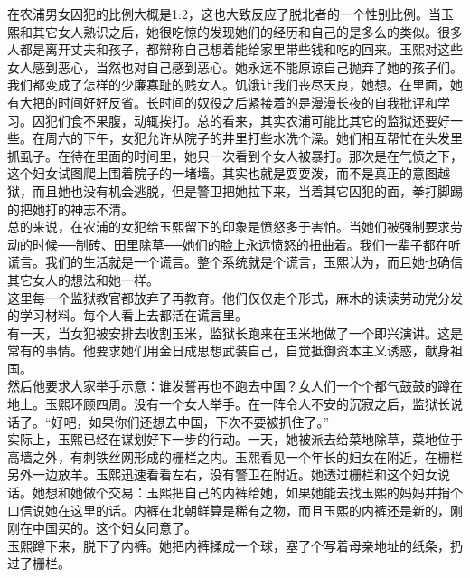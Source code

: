 \begin{multicols}{\theparacolNo}
在农浦男女囚犯的比例大概是1:2，这也大致反应了脱北者的一个性别比例。当玉熙和其它女人熟识之后，她很吃惊的发现她们的经历和自己的是多么的类似。很多人都是离开丈夫和孩子，都辩称自己想着能给家里带些钱和吃的回来。玉熙对这些女人感到恶心，当然也对自己感到恶心。她永远不能原谅自己抛弃了她的孩子们。我们都变成了怎样的少廉寡耻的贱女人。饥饿让我们丧尽天良，她想。在里面，她有大把的时间好好反省。长时间的奴役之后紧接着的是漫漫长夜的自我批评和学习。囚犯们食不果腹，动辄挨打。总的看来，其实农浦可能比其它的监狱还要好一些。在周六的下午，女犯允许从院子的井里打些水洗个澡。她们相互帮忙在头发里抓虱子。在待在里面的时间里，她只一次看到个女人被暴打。那次是在气愤之下，这个妇女试图爬上围着院子的一堵墙。其实也就是耍耍泼，而不是真正的意图越狱，而且她也没有机会逃脱，但是警卫把她拉下来，当着其它囚犯的面，拳打脚踢的把她打的神志不清。\\

总的来说，在农浦的女犯给玉熙留下的印象是愤怒多于害怕。当她们被强制要求劳动的时候──制砖、田里除草──她们的脸上永远愤怒的扭曲着。我们一辈子都在听谎言。我们的生活就是一个谎言。整个系统就是个谎言，玉熙认为，而且她也确信其它女人的想法和她一样。\\

这里每一个监狱教官都放弃了再教育。他们仅仅走个形式，麻木的读读劳动党分发的学习材料。每个人看上去都活在谎言里。\\

有一天，当女犯被安排去收割玉米，监狱长跑来在玉米地做了一个即兴演讲。这是常有的事情。他要求她们用金日成思想武装自己，自觉抵御资本主义诱惑，献身祖国。\\

然后他要求大家举手示意：谁发誓再也不跑去中国？女人们一个个都气鼓鼓的蹲在地上。玉熙环顾四周。没有一个女人举手。在一阵令人不安的沉寂之后，监狱长说话了。“好吧，如果你们还想去中国，下次不要被抓住了。”\\

实际上，玉熙已经在谋划好下一步的行动。一天，她被派去给菜地除草，菜地位于高墙之外，有刺铁丝网形成的栅栏之内。玉熙看见一个年长的妇女在附近，在栅栏另外一边放羊。玉熙迅速看看左右，没有警卫在附近。她透过栅栏和这个妇女说话。她想和她做个交易：玉熙把自己的内裤给她，如果她能去找玉熙的妈妈并捎个口信说她在这里的话。内裤在北朝鲜算是稀有之物，而且玉熙的内裤还是新的，刚刚在中国买的。这个妇女同意了。\\

玉熙蹲下来，脱下了内裤。她把内裤揉成一个球，塞了个写着母亲地址的纸条，扔过了栅栏。\\
\ifnum{}
	\end{multicols}
\fi